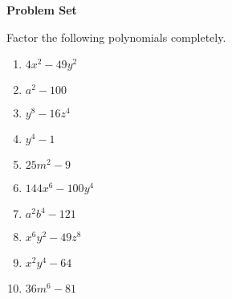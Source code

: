 \textbf{Problem Set}

\vspce

Factor the following polynomials completely.  
\begin{enumerate}

\item \hspce $4x^{2} - 49y^{2}$
\item \hspce $a^{2} - 100$
\item \hspce $y^{8} - 16z^{4}$
\item \hspce $y^{4} - 1$
\item \hspce $25m^{2} - 9$
\item \hspce $144x^{6} - 100y^{4}$
\item \hspce $a^{2}b^4 - 121$
\item \hspce $x^{6}y^2 - 49z^{8}$
\item \hspce $x^2y^{4} - 64$
\item \hspce $36m^{6} - 81$

\end{enumerate}